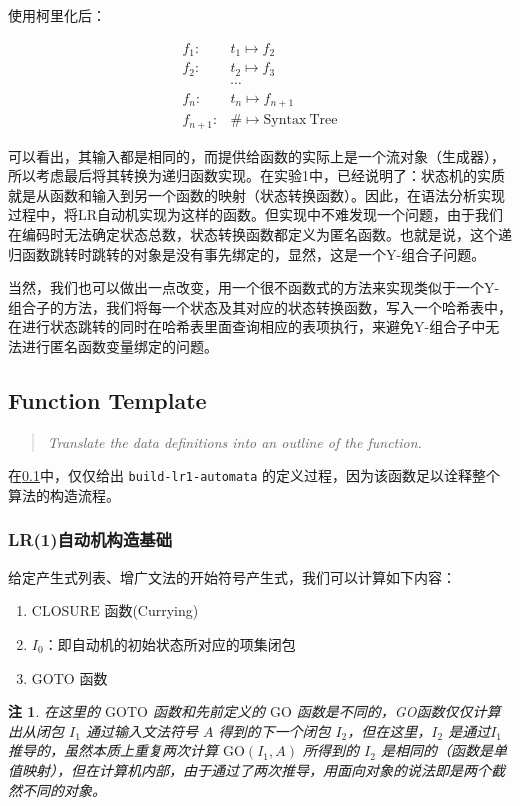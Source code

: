 \documentclass[lang=cn]{ctexart}
\newtheorem{remark}{注}
\begin{document}
{使用柯里化后：

$$
\begin{aligned}
	f_1:&t_1\mapsto f_2\\
	f_2:&t_2\mapsto f_3\\
	&\cdots\\
	f_n:&t_n \mapsto f_{n+1}\\
	f_{n+1}:&\# \mapsto \mathrm{Syntax~Tree}
\end{aligned}
$$

可以看出，其输入都是相同的，而提供给函数的实际上是一个流对象（生成器），所以考虑最后将其转换为递归函数实现。在实验1中，已经说明了：状态机的实质就是从函数和输入到另一个函数的映射（状态转换函数）。因此，在语法分析实现过程中，将LR自动机实现为这样的函数。但实现中不难发现一个问题，由于我们在编码时无法确定状态总数，状态转换函数都定义为匿名函数。也就是说，这个递归函数跳转时跳转的对象是没有事先绑定的，显然，这是一个Y-组合子问题。

当然，我们也可以做出一点改变，用一个很不函数式的方法来实现类似于一个Y-组合子的方法，我们将每一个状态及其对应的状态转换函数，写入一个哈希表中，在进行状态跳转的同时在哈希表里面查询相应的表项执行，来避免Y-组合子中无法进行匿名函数变量绑定的问题。

\subsection{Function Template}\label{Function-Template}
\begin{quotation}
	\textit{Translate the data definitions into an outline of the function.}
\end{quotation}

在\ref{Function-Template}中，仅仅给出 \lstinline|build-lr1-automata| 的定义过程，因为该函数足以诠释整个算法的构造流程。

\subsubsection{LR(1)自动机构造基础}

给定产生式列表、增广文法的开始符号产生式，我们可以计算如下内容：

\begin{enumerate}
	\item $\mathrm{CLOSURE}$ 函数(Currying)
	\item $I_0$：即自动机的初始状态所对应的项集闭包
	\item $\mathrm{GOTO}$ 函数
\end{enumerate}

\begin{remark}
	在这里的 $\mathrm{GOTO}$ 函数和先前定义的 $\mathrm{GO}$ 函数是不同的，GO函数仅仅计算出从闭包 $I_1$ 通过输入文法符号 $A$ 得到的下一个闭包 $I_2$，但在这里，$I_2$ 是通过$I_1$推导的，虽然本质上重复两次计算 $\mathrm{GO}(I_1, A)$ 所得到的 $I_2$ 是相同的（函数是单值映射），但在计算机内部，由于通过了两次推导，用面向对象的说法即是两个截然不同的对象。
\end{remark}

}
\end{document}
